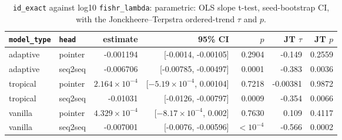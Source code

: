 \documentclass[10pt]{article}
\begin{document}
{\small
\begin{longtable}{llrrrrr}
\caption{\texttt{id\_exact} against log10 \texttt{fishr\_lambda}: parametric: OLS slope t-test, seed-bootstrap CI, with the Jonckheere--Terpstra ordered-trend $\tau$ and $p$.}\label{tab:trend-id_exact}\\
\toprule
\texttt{model\_type} & \texttt{head} & estimate & 95\% CI & $p$ & JT $\tau$ & JT $p$\\
\midrule
\endhead
adaptive & pointer & -0.001194 & [-0.0014, -0.00105] & 0.2904 & -0.149 & 0.2559\\
adaptive & seq2seq & -0.006706 & [-0.00785, -0.00497] & 0.0001 & -0.383 & 0.0036\\
tropical & pointer & $2.164\times10^{-4}$ & [$-5.19\times10^{-4}$, 0.00104] & 0.7218 & -0.00381 & 0.9872\\
tropical & seq2seq & -0.01031 & [-0.0126, -0.00797] & 0.0009 & -0.354 & 0.0066\\
vanilla & pointer & $4.329\times10^{-4}$ & [$-8.17\times10^{-4}$, 0.002] & 0.7630 & 0.109 & 0.4117\\
vanilla & seq2seq & -0.007001 & [-0.0076, -0.00596] & $<10^{-4}$ & -0.566 & 0.0002\\
\bottomrule
\end{longtable}
}
\end{document}
